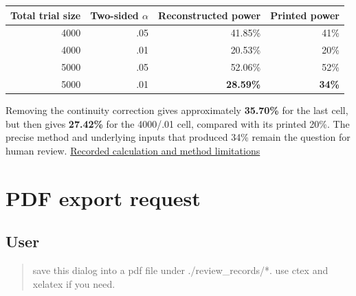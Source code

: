 \documentclass[UTF8,fontset=none,11pt,a4paper]{ctexart}
\newcommand{\recordlink}[2]{\href{#1}{#2}}
\begin{document}
\begin{center}
\begin{tabular}{rrrr}
\toprule
Total trial size & Two-sided $\alpha$ & Reconstructed power & Printed power \\
\midrule
4000 & .05 & 41.85\% & 41\% \\
4000 & .01 & 20.53\% & 20\% \\
5000 & .05 & 52.06\% & 52\% \\
5000 & .01 & \textbf{28.59\%} & \textbf{34\%} \\
\bottomrule
\end{tabular}
\end{center}

Removing the continuity correction gives approximately \textbf{35.70\%} for the last cell, but then gives \textbf{27.42\%} for the 4000/.01 cell, compared with its printed 20\%. The precise method and underlying inputs that produced 34\% remain the question for human review. \recordlink{../.ai_paper_validation/review_1_6_2/verification/evidence_recheck.md}{Recorded calculation and method limitations}

\section{PDF export request}
\subsection*{User}
\begin{quote}
save this dialog into a pdf file under ./review\_records/*. use ctex and xelatex if you need.
\end{quote}
\end{document}
